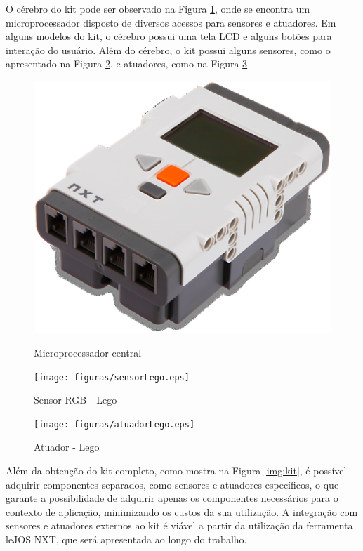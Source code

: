 O cérebro do kit pode ser observado na Figura \ref{img:cerebro}, onde se encontra um microprocessador disposto de diversos acessos para sensores e atuadores. Em alguns modelos do kit, o cérebro possui uma tela LCD e alguns botões para interação do usuário. Além do cérebro, o kit possui alguns sensores, como o apresentado na Figura \ref{img:sensorLego}, e atuadores, como na Figura \ref{img:atuadorLego}

\begin{figure}[H]
	\centering
	\includegraphics[scale=0.4]{figuras/brick.eps}
	\label{img:cerebro}
	\caption[Microprocessador central]{Microprocessador central}
\end{figure}

\begin{figure}[H]
	\centering
	\texttt{[image: figuras/sensorLego.eps]}
	\caption[Sensor RGB - Lego]{Sensor RGB - Lego}
	\label{img:sensorLego}
\end{figure}

\begin{figure}[H]
	\centering
	\texttt{[image: figuras/atuadorLego.eps]}
	\caption[Atuador - Lego]{Atuador - Lego}
	\label{img:atuadorLego}
\end{figure}

Além da obtenção do kit completo, como mostra na Figura \ref{img:kit}, é possível adquirir componentes separados, como sensores e atuadores específicos, o que garante a possibilidade de adquirir apenas os componentes necessários para o contexto de aplicação, minimizando os custos da sua utilização. A integração com sensores e atuadores externos ao kit é viável a partir da utilização da ferramenta leJOS NXT, que será apresentada ao longo do trabalho.


